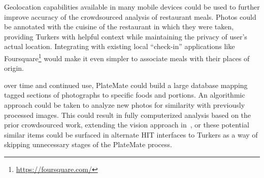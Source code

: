 Geolocation capabilities available in many mobile devices could be used to further improve accuracy of the crowdsourced analysis of restaurant meals. Photos could be annotated with the cuisine of the restaurant in which they were taken, providing Turkers with helpful context while maintaining the privacy of user's actual location.  Integrating with existing local ``check-in'' applications like Foursquare\footnote{\url{https://foursquare.com/}} would make it even simpler to associate meals with their places of origin.

  over time and continued use, PlateMate could build a large database mapping tagged sections of photographs to specific foods and portions.  An algorithmic approach could be taken to analyze new photos for similarity with previously processed images.  This could result in fully computerized analysis based on the prior crowdsourced work, extending the vision approach in~\cite{kitamura2010image}, or these potential similar items could be surfaced in alternate HIT interfaces to Turkers as a way of skipping unnecessary stages of the PlateMate process.


